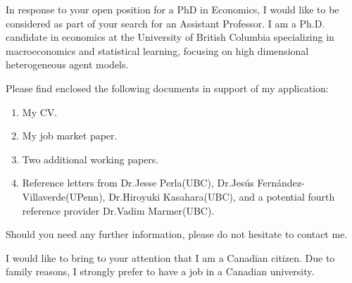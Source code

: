 \documentclass[11pt, a4paper]{awesome-cv}
\begin{document}
\makecvheader
\makelettertitle
\begin{cvletter}

 In response to your open position for a PhD in Economics, I would like to be considered as part of your search for an Assistant Professor. I am a Ph.D. candidate in economics at the University of British Columbia specializing in macroeconomics and statistical learning, focusing on high dimensional heterogeneous agent models.
 
 Please find enclosed the following documents in support of my application:
 \begin{enumerate}
 	\item My CV.
 	\item My job market paper.
 	\item Two additional working papers.
 	\item Reference letters from Dr.Jesse Perla(UBC), Dr.Jesús Fernández-Villaverde(UPenn), Dr.Hiroyuki Kasahara(UBC), and a potential fourth reference provider Dr.Vadim Marmer(UBC).
 \end{enumerate}
 Should you need any further information, please do not hesitate to contact me.
 

I would like to bring to your attention that I am a Canadian citizen. Due to family reasons, I strongly prefer to have a job in a Canadian university.









\end{cvletter}

\makeletterclosing
\end{document}
